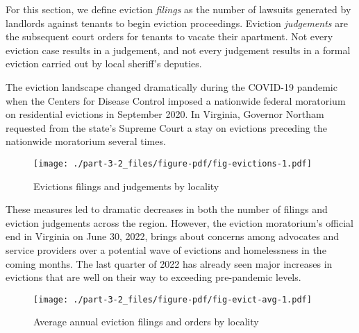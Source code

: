 \documentclass[
  letterpaper,
  DIV=11,
  numbers=noendperiod]{scrreprt}
\begin{document}
\begin{tcolorbox}[enhanced jigsaw, colframe=quarto-callout-tip-color-frame, arc=.35mm, bottomrule=.15mm, colbacktitle=quarto-callout-tip-color!10!white, opacityback=0, left=2mm, rightrule=.15mm, title=\textcolor{quarto-callout-tip-color}{\faLightbulb}\hspace{0.5em}{Defining evictions}, colback=white, coltitle=black, toptitle=1mm, leftrule=.75mm, titlerule=0mm, breakable, opacitybacktitle=0.6, toprule=.15mm, bottomtitle=1mm]

For this section, we define eviction \emph{filings} as the number of
lawsuits generated by landlords against tenants to begin eviction
proceedings. Eviction \emph{judgements} are the subsequent court orders
for tenants to vacate their apartment. Not every eviction case results
in a judgement, and not every judgement results in a formal eviction
carried out by local sheriff's deputies.

\end{tcolorbox}

The eviction landscape changed dramatically during the COVID-19 pandemic
when the Centers for Disease Control imposed a nationwide federal
moratorium on residential evictions in September 2020. In Virginia,
Governor Northam requested from the state's Supreme Court a stay on
evictions preceding the nationwide moratorium several times.

\begin{figure}

{\centering \texttt{[image: ./part-3-2\_files/figure-pdf/fig-evictions-1.pdf]}

}

\caption{\label{fig-evictions}Evictions filings and judgements by
locality}

\end{figure}

These measures led to dramatic decreases in both the number of filings
and eviction judgements across the region. However, the eviction
moratorium's official end in Virginia on June 30, 2022, brings about
concerns among advocates and service providers over a potential wave of
evictions and homelessness in the coming months. The last quarter of
2022 has already seen major increases in evictions that are well on
their way to exceeding pre-pandemic levels.

\begin{figure}

{\centering \texttt{[image: ./part-3-2\_files/figure-pdf/fig-evict-avg-1.pdf]}

}

\caption{\label{fig-evict-avg}Average annual eviction filings and orders
by locality}

\end{figure}
\end{document}
